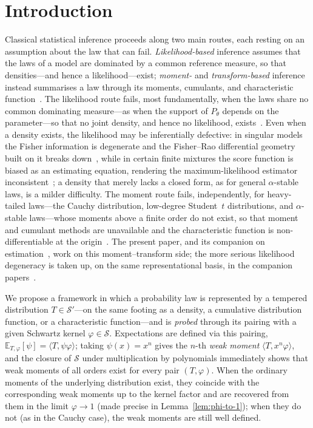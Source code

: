 \documentclass[12pt]{article}
\theoremstyle{definition}
\newcommand{\E}{\mathbb{E}}
\newcommand{\Feight} {\fontsize{8}{11}\selectfont  }
\begin{document}
\newpage
\Feight \tableofcontents
\newpage
{}
\normalsize

\section{Introduction}
\label{sec:introduction}

Classical statistical inference proceeds along two main routes, each resting on an assumption about the law that can fail.  \emph{Likelihood-based} inference assumes that the laws of a model are dominated by a common reference measure, so that densities---and hence a likelihood---exist; \emph{moment-} and \emph{transform-based} inference instead summarises a law through its moments, cumulants, and characteristic function~\cite{Billingsley1995,van2000asymptotic}.  The likelihood route fails, most fundamentally, when the laws share no common dominating measure---as when the support of $P_\theta$ depends on the parameter---so that no joint density, and hence no likelihood, exists~\cite{LabouriauTransversality}.  Even when a density exists, the likelihood may be inferentially defective: in singular models the Fisher information is degenerate and the Fisher--Rao differential geometry built on it breaks down~\cite{Watanabe2009}, while in certain finite mixtures the score function is biased as an estimating equation, rendering the maximum-likelihood estimator inconsistent~\cite{LabouriauMixture}; a density that merely lacks a closed form, as for general $\alpha$-stable laws, is a milder difficulty.  The moment route fails, independently, for heavy-tailed laws---the Cauchy distribution, low-degree Student~$t$ distributions, and $\alpha$-stable laws---whose moments above a finite order do not exist, so that moment and cumulant methods are unavailable and the characteristic function is non-differentiable at the origin~\cite{Feller1971,Samorodnitsky1994}.  The present paper, and its companion on estimation~\cite{LabouriauA2}, work on this moment--transform side; the more serious likelihood degeneracy is taken up, on the same representational basis, in the companion papers~\cite{LabouriauPaperD,LabouriauTransversality}.

We propose a framework in which a probability law is represented by a tempered distribution $T\in\mathcal{S}'$---on the same footing as a density, a cumulative distribution function, or a characteristic function---and is \emph{probed} through its pairing with a given Schwartz kernel $\varphi\in\mathcal{S}$.  Expectations are defined via this pairing, $\E_{T,\varphi}[\psi]=\langle T,\psi\varphi\rangle$; taking $\psi(x)=x^n$ gives the $n$-th \emph{weak moment} $\langle T,x^n\varphi\rangle$, and the closure of $\mathcal{S}$ under multiplication by polynomials immediately shows that weak moments of all orders exist for every pair $(T,\varphi)$.  When the ordinary moments of the underlying distribution exist, they coincide with the corresponding weak moments up to the kernel factor and are recovered from them in the limit $\varphi\to1$ (made precise in Lemma~\ref{lem:phi-to-1}); when they do not (as in the Cauchy case), the weak moments are still well defined.
\end{document}
